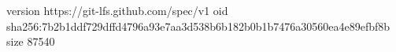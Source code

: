 version https://git-lfs.github.com/spec/v1
oid sha256:7b2b1ddf729dffd4796a93e7aa3d538b6b182b0b1b7476a30560ea4e89efbf8b
size 87540
